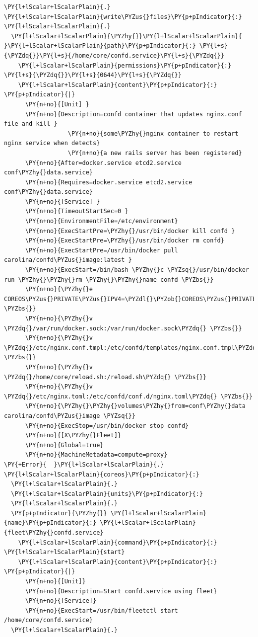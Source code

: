 \begin{codelisting}
\label{code:confd}
\begin{Verbatim}[fontsize=\relsize{-2.5},fontseries=b,commandchars=\\\{\}]
\PY{l+lScalar+lScalarPlain}{.}
\PY{l+lScalar+lScalarPlain}{write\PYZus{}files}\PY{p+pIndicator}{:}
\PY{l+lScalar+lScalarPlain}{.}
  \PY{l+lScalar+lScalarPlain}{\PYZhy{}}\PY{l+lScalar+lScalarPlain}{ }\PY{l+lScalar+lScalarPlain}{path}\PY{p+pIndicator}{:} \PY{l+s}{\PYZdq{}}\PY{l+s}{/home/core/confd.service}\PY{l+s}{\PYZdq{}}
    \PY{l+lScalar+lScalarPlain}{permissions}\PY{p+pIndicator}{:} \PY{l+s}{\PYZdq{}}\PY{l+s}{0644}\PY{l+s}{\PYZdq{}}
    \PY{l+lScalar+lScalarPlain}{content}\PY{p+pIndicator}{:} \PY{p+pIndicator}{|}
      \PY{n+no}{[Unit] }
      \PY{n+no}{Description=confd container that updates nginx.conf file and kill }
                  \PY{n+no}{some\PYZhy{}nginx container to restart nginx service when detects}
                  \PY{n+no}{a new rails server has been registered}
      \PY{n+no}{After=docker.service etcd2.service conf\PYZhy{}data.service}
      \PY{n+no}{Requires=docker.service etcd2.service conf\PYZhy{}data.service}
      \PY{n+no}{[Service] }
      \PY{n+no}{TimeoutStartSec=0 }
      \PY{n+no}{EnvironmentFile=/etc/environment}
      \PY{n+no}{ExecStartPre=\PYZhy{}/usr/bin/docker kill confd }
      \PY{n+no}{ExecStartPre=\PYZhy{}/usr/bin/docker rm confd}
      \PY{n+no}{ExecStartPre=/usr/bin/docker pull carolina/confd\PYZus{}image:latest }
      \PY{n+no}{ExecStart=/bin/bash \PYZhy{}c \PYZsq{}/usr/bin/docker run \PYZhy{}\PYZhy{}rm \PYZhy{}\PYZhy{}name confd \PYZbs{}}
      \PY{n+no}{\PYZhy{}e COREOS\PYZus{}PRIVATE\PYZus{}IPV4=\PYZdl{}\PYZob{}COREOS\PYZus{}PRIVATE\PYZus{}IPV4\PYZcb{} \PYZbs{}}
      \PY{n+no}{\PYZhy{}v \PYZdq{}/var/run/docker.sock:/var/run/docker.sock\PYZdq{} \PYZbs{}}
      \PY{n+no}{\PYZhy{}v \PYZdq{}/etc/nginx.conf.tmpl:/etc/confd/templates/nginx.conf.tmpl\PYZdq{} \PYZbs{}}
      \PY{n+no}{\PYZhy{}v \PYZdq{}/home/core/reload.sh:/reload.sh\PYZdq{} \PYZbs{}}
      \PY{n+no}{\PYZhy{}v \PYZdq{}/etc/nginx.toml:/etc/confd/conf.d/nginx.toml\PYZdq{} \PYZbs{}}
      \PY{n+no}{\PYZhy{}\PYZhy{}volumes\PYZhy{}from=conf\PYZhy{}data carolina/confd\PYZus{}image \PYZsq{}}
      \PY{n+no}{ExecStop=/usr/bin/docker stop confd}
      \PY{n+no}{[X\PYZhy{}Fleet]}
      \PY{n+no}{Global=true}
      \PY{n+no}{MachineMetadata=compute=proxy}
\PY{+Error}{  }\PY{l+lScalar+lScalarPlain}{.}
\PY{l+lScalar+lScalarPlain}{coreos}\PY{p+pIndicator}{:}
  \PY{l+lScalar+lScalarPlain}{.}
  \PY{l+lScalar+lScalarPlain}{units}\PY{p+pIndicator}{:}
  \PY{l+lScalar+lScalarPlain}{.}
  \PY{p+pIndicator}{\PYZhy{}} \PY{l+lScalar+lScalarPlain}{name}\PY{p+pIndicator}{:} \PY{l+lScalar+lScalarPlain}{fleet\PYZhy{}confd.service}
    \PY{l+lScalar+lScalarPlain}{command}\PY{p+pIndicator}{:} \PY{l+lScalar+lScalarPlain}{start}
    \PY{l+lScalar+lScalarPlain}{content}\PY{p+pIndicator}{:} \PY{p+pIndicator}{|}
      \PY{n+no}{[Unit]}
      \PY{n+no}{Description=Start confd.service using fleet}
      \PY{n+no}{[Service]}
      \PY{n+no}{ExecStart=/usr/bin/fleetctl start /home/core/confd.service}
  \PY{l+lScalar+lScalarPlain}{.}
\end{Verbatim}
\end{codelisting}

